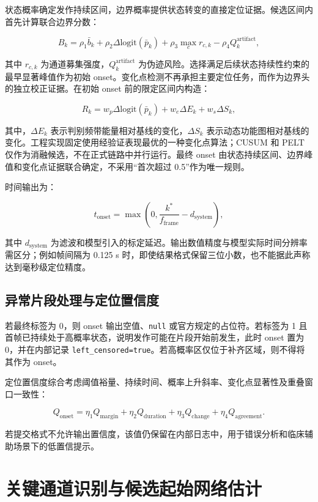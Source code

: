 状态概率确定发作持续区间，边界概率提供状态转变的直接定位证据。候选区间内首先计算联合边界分数：

$$
B_k=\rho_1\bar b_k
+\rho_2\Delta\mathrm{logit}(\bar p_k)
+\rho_3\max_c r_{c,k}
-\rho_4Q_k^{\mathrm{artifact}},
$$

其中 $r_{c,k}$ 为通道募集强度，$Q_k^{\mathrm{artifact}}$ 为伪迹风险。选择满足后续状态持续性约束的最早显著峰值作为初始 onset。变化点检测不再承担主要定位任务，而作为边界头的独立校正证据。在初始 onset 前的限定区间内构造：

$$
R_k=
w_p\Delta\mathrm{logit}(\bar p_k)
+w_e\Delta E_k
+w_s\Delta S_k,
$$

其中，$\Delta E_k$ 表示判别频带能量相对基线的变化，$\Delta S_k$ 表示动态功能图相对基线的变化。工程实现固定使用经验证表现最优的一种变化点算法；CUSUM 和 PELT 仅作为消融候选，不在正式链路中并行运行。最终 onset 由状态持续区间、边界峰值和变化点证据联合确定，不采用“首次超过 0.5”作为唯一规则。

时间输出为：

$$
t_{\mathrm{onset}}=
\max\left(0,\frac{k^*}{f_{\mathrm{frame}}}-d_{\mathrm{system}}\right),
$$

其中 $d_{\mathrm{system}}$ 为滤波和模型引入的标定延迟。输出数值精度与模型实际时间分辨率需区分；例如帧间隔为 0.125 s 时，即使结果格式保留三位小数，也不能据此声称达到毫秒级定位精度。

\subsection{异常片段处理与定位置信度}

若最终标签为 0，则 onset 输出空值、\texttt{null} 或官方规定的占位符。若标签为 1 且首帧已持续处于高概率状态，说明发作可能在片段开始前发生，此时 onset 置为 0，并在内部记录 \texttt{left\_censored=true}。若高概率区仅位于补齐区域，则不得将其作为 onset。

定位置信度综合考虑阈值裕量、持续时间、概率上升斜率、变化点显著性及重叠窗口一致性：

$$
Q_{\mathrm{onset}}=
\eta_1Q_{\mathrm{margin}}
+\eta_2Q_{\mathrm{duration}}
+\eta_3Q_{\mathrm{change}}
+\eta_4Q_{\mathrm{agreement}}.
$$

若提交格式不允许输出置信度，该值仍保留在内部日志中，用于错误分析和临床辅助场景下的低置信提示。

\clearpage
\section{关键通道识别与候选起始网络估计}

